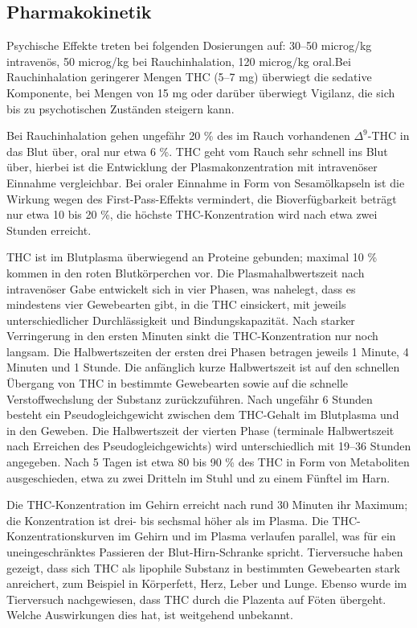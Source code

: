 \documentclass[openany]{scrbook}
\begin{document}
	
\subsection{Pharmakokinetik}
	Psychische Effekte treten bei folgenden Dosierungen auf: 30–50 microg/kg intravenös, 50 microg/kg bei Rauchinhalation, 120 microg/kg oral.Bei Rauchinhalation geringerer Mengen THC (5–7 mg) überwiegt die sedative Komponente, bei Mengen von 15 mg oder darüber überwiegt Vigilanz, die sich bis zu psychotischen Zuständen steigern kann.
	
	Bei Rauchinhalation gehen ungefähr 20 \% des im Rauch vorhandenen $\Delta^9$-THC in das Blut über, oral nur etwa 6 \%. THC geht vom Rauch sehr schnell ins Blut über, hierbei ist die Entwicklung der Plasmakonzentration mit intravenöser Einnahme vergleichbar. Bei oraler Einnahme in Form von Sesamölkapseln ist die Wirkung wegen des First-Pass-Effekts vermindert, die Bioverfügbarkeit beträgt nur etwa 10 bis 20 \%, die höchste THC-Konzentration wird nach etwa zwei Stunden erreicht.
	
	THC ist im Blutplasma überwiegend an Proteine gebunden; maximal 10 \% kommen in den roten Blutkörperchen vor. Die Plasmahalbwertszeit nach intravenöser Gabe entwickelt sich in vier Phasen, was nahelegt, dass es mindestens vier Gewebearten gibt, in die THC einsickert, mit jeweils unterschiedlicher Durchlässigkeit und Bindungskapazität. Nach starker Verringerung in den ersten Minuten sinkt die THC-Konzentration nur noch langsam. Die Halbwertszeiten der ersten drei Phasen betragen jeweils 1 Minute, 4 Minuten und 1 Stunde. Die anfänglich kurze Halbwertszeit ist auf den schnellen Übergang von THC in bestimmte Gewebearten sowie auf die schnelle Verstoffwechslung der Substanz zurückzuführen. Nach ungefähr 6 Stunden besteht ein Pseudogleichgewicht zwischen dem THC-Gehalt im Blutplasma und in den Geweben. Die Halbwertszeit der vierten Phase (terminale Halbwertszeit nach Erreichen des Pseudogleichgewichts) wird unterschiedlich mit 19–36 Stunden angegeben. Nach 5 Tagen ist etwa 80 bis 90 \% des THC in Form von Metaboliten ausgeschieden, etwa zu zwei Dritteln im Stuhl und zu einem Fünftel im Harn.
	
	Die THC-Konzentration im Gehirn erreicht nach rund 30 Minuten ihr Maximum; die Konzentration ist drei- bis sechsmal höher als im Plasma. Die THC-Konzentrationskurven im Gehirn und im Plasma verlaufen parallel, was für ein uneingeschränktes Passieren der Blut-Hirn-Schranke spricht. Tierversuche haben gezeigt, dass sich THC als lipophile Substanz in bestimmten Gewebearten stark anreichert, zum Beispiel in Körperfett, Herz, Leber und Lunge. Ebenso wurde im Tierversuch nachgewiesen, dass THC durch die Plazenta auf Föten übergeht. Welche Auswirkungen dies hat, ist weitgehend unbekannt.
	
\end{document}
